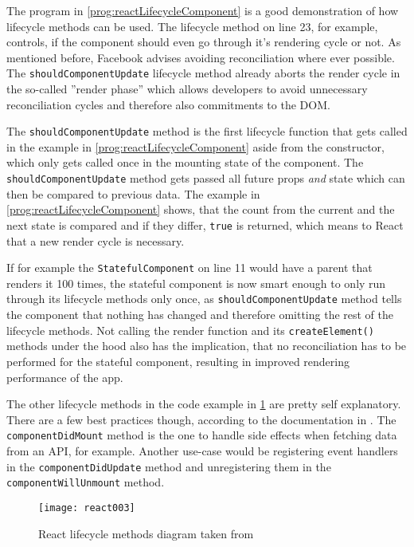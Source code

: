The program in \ref{prog:reactLifecycleComponent} is a good demonstration of how lifecycle methods can be used. The lifecycle method on line 23, for example, controls, if the component should even go through it's rendering cycle or not. As mentioned before, Facebook advises avoiding reconciliation where ever possible. The \texttt{shouldComponentUpdate} lifecycle method already aborts the render cycle in the so-called ''render phase'' which allows developers to avoid unnecessary reconciliation cycles and therefore also commitments to the DOM. 

The \texttt{shouldComponentUpdate} method is the first lifecycle function that gets called in the example in \ref{prog:reactLifecycleComponent} aside from the constructor, which only gets called once in the mounting state of the component. The \texttt{shouldComponentUpdate} method gets passed all future props \emph{and} state which can then be compared to previous data. The example in \ref{prog:reactLifecycleComponent} shows, that the count from the current and the next state is compared and if they differ, \texttt{true} is returned, which means to React that a new render cycle is necessary. 

If for example the \texttt{StatefulComponent} on line 11 would have a parent that renders it 100 times, the stateful component is now smart enough to only run through its lifecycle methods only once, as \texttt{shouldComponentUpdate} method tells the component that nothing has changed and therefore omitting the rest of the lifecycle methods. Not calling the render function and its \texttt{createElement()} methods under the hood also has the implication, that no reconciliation has to be performed for the stateful component, resulting in improved rendering performance of the app.

The other lifecycle methods in the code example in \ref{fig:reactLifecycleMethods} are pretty self explanatory. There are a few best practices though, according to the documentation in \cite{React}. The \texttt{componentDidMount} method is the one to handle side effects when fetching data from an API, for example. Another use-case would be registering event handlers in the \texttt{componentDidUpdate} method and unregistering them in the \texttt{componentWillUnmount} method.

\begin{figure}
  \centering
  \texttt{[image: react003]}
  \caption{React lifecycle methods diagram taken from \cite{ReactRenderCycleDiagram}}
  \label{fig:reactLifecycleMethods}
\end{figure}


